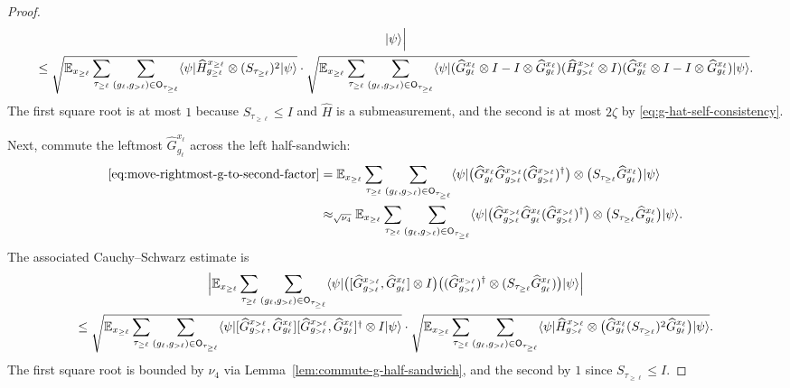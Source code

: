 \begin{proof}
\begin{multline}
		\lvert \psi \rangle
		\Bigr|\\
		\le
		\sqrt{
		\mathbb{E}_{x_{\ge \ell}} \sum_{\tau_{\ge \ell}} \sum_{(g_\ell,g_{>\ell})\in \mathsf O_{\tau_{\ge \ell}}}
		\langle \psi \rvert \widehat H_{g_{\ge \ell}}^{x_{\ge \ell}} \otimes (S_{\tau_{\ge \ell}})^2 \lvert \psi \rangle
		}
		\cdot
		\sqrt{
		\mathbb{E}_{x_{\ge \ell}} \sum_{\tau_{\ge \ell}} \sum_{(g_\ell,g_{>\ell})\in \mathsf O_{\tau_{\ge \ell}}}
		\langle \psi \rvert
		(\widehat G_{g_\ell}^{x_\ell}\otimes I - I \otimes \widehat G_{g_\ell}^{x_\ell})
		(\widehat H_{g_{>\ell}}^{x_{>\ell}} \otimes I)
		(\widehat G_{g_\ell}^{x_\ell}\otimes I - I \otimes \widehat G_{g_\ell}^{x_\ell})
		\lvert \psi \rangle
		}.
	\end{multline}
	The first square root is at most $1$ because $S_{\tau_{\ge \ell}}\le I$ and $\widehat H$ is a submeasurement, and the second is at most $2\zeta$ by \ref{eq:g-hat-self-consistency}.

	Next, commute the leftmost $\widehat G_{g_\ell}^{x_\ell}$ across the left half-sandwich:
	\begin{align}
		\eqref{eq:move-rightmost-g-to-second-factor}
		 & =
		\mathbb{E}_{x_{\ge \ell}} \sum_{\tau_{\ge \ell}} \sum_{(g_\ell,g_{>\ell})\in \mathsf O_{\tau_{\ge \ell}}}
		\langle \psi \rvert
		\bigl(\widehat G_{g_\ell}^{x_\ell}\widehat G_{g_{>\ell}}^{x_{>\ell}}(\widehat G_{g_{>\ell}}^{x_{>\ell}})^\dagger\bigr)
		\otimes \bigl(S_{\tau_{\ge \ell}}\widehat G_{g_\ell}^{x_\ell}\bigr)\lvert \psi \rangle\nonumber \\
		 & \approx_{\sqrt{\nu_4}}
		\mathbb{E}_{x_{\ge \ell}} \sum_{\tau_{\ge \ell}} \sum_{(g_\ell,g_{>\ell})\in \mathsf O_{\tau_{\ge \ell}}}
		\langle \psi \rvert
		\bigl(\widehat G_{g_{>\ell}}^{x_{>\ell}}\widehat G_{g_\ell}^{x_\ell}(\widehat G_{g_{>\ell}}^{x_{>\ell}})^\dagger\bigr)
		\otimes \bigl(S_{\tau_{\ge \ell}}\widehat G_{g_\ell}^{x_\ell}\bigr)\lvert \psi \rangle.
		\label{eq:commute-g-part-one}
	\end{align}
	The associated Cauchy--Schwarz estimate is
	\begin{multline}\label{eq:adjoint-commutator-cauchy-schwarz}
		\Bigl|
		\mathbb{E}_{x_{\ge \ell}} \sum_{\tau_{\ge \ell}} \sum_{(g_\ell,g_{>\ell})\in \mathsf O_{\tau_{\ge \ell}}}
		\langle \psi \rvert
		\bigl([\widehat G_{g_{>\ell}}^{x_{>\ell}},\widehat G_{g_\ell}^{x_\ell}] \otimes I\bigr)
		\bigl((\widehat G_{g_{>\ell}}^{x_{>\ell}})^\dagger \otimes (S_{\tau_{\ge \ell}}\widehat G_{g_\ell}^{x_\ell})\bigr)
		\lvert \psi \rangle
		\Bigr|\\
		\le
		\sqrt{
		\mathbb{E}_{x_{\ge \ell}} \sum_{\tau_{\ge \ell}} \sum_{(g_\ell,g_{>\ell})\in \mathsf O_{\tau_{\ge \ell}}}
		\langle \psi \rvert
		[\widehat G_{g_{>\ell}}^{x_{>\ell}},\widehat G_{g_\ell}^{x_\ell}]
		[\widehat G_{g_{>\ell}}^{x_{>\ell}},\widehat G_{g_\ell}^{x_\ell}]^\dagger
		\otimes I
		\lvert \psi \rangle
		}
		\cdot
		\sqrt{
		\mathbb{E}_{x_{\ge \ell}} \sum_{\tau_{\ge \ell}} \sum_{(g_\ell,g_{>\ell})\in \mathsf O_{\tau_{\ge \ell}}}
		\langle \psi \rvert
		\widehat H_{g_{>\ell}}^{x_{>\ell}}
		\otimes \bigl(\widehat G_{g_\ell}^{x_\ell}(S_{\tau_{\ge \ell}})^2\widehat G_{g_\ell}^{x_\ell}\bigr)
		\lvert \psi \rangle
		}.
	\end{multline}
	The first square root is bounded by $\nu_4$ via Lemma~\ref{lem:commute-g-half-sandwich}, and the second by $1$ since $S_{\tau_{\ge \ell}}\le I$.


\end{proof}
